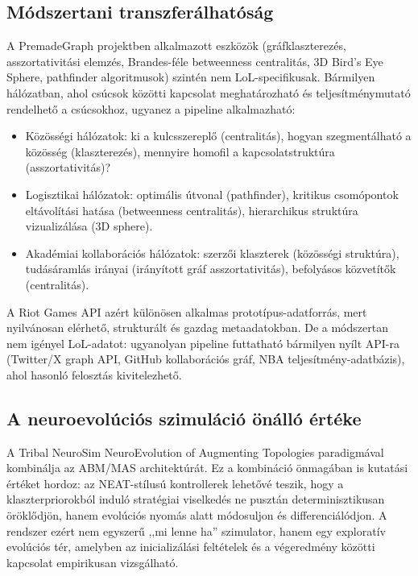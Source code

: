\subsection*{Módszertani transzferálhatóság}

A PremadeGraph projektben alkalmazott eszközök (gráfklaszterezés, asszortativitási
elemzés, Brandes-féle betweenness centralitás, 3D Bird's Eye Sphere, pathfinder
algoritmusok) szintén nem LoL-specifikusak. Bármilyen hálózatban, ahol csúcsok
közötti kapcsolat meghatározható és teljesítménymutató rendelhető a csúcsokhoz,
ugyanez a pipeline alkalmazható:

\begin{itemize}
  \item Közösségi hálózatok: ki a kulcsszereplő (centralitás), hogyan szegmentálható
    a közösség (klaszterezés), mennyire homofil a kapcsolatstruktúra (asszortativitás)?
  \item Logisztikai hálózatok: optimális útvonal (pathfinder), kritikus csomópontok
    eltávolítási hatása (betweenness centralitás), hierarchikus struktúra vizualizálása
    (3D sphere).
  \item Akadémiai kollaborációs hálózatok: szerzői klaszterek (közösségi struktúra),
    tudásáramlás irányai (irányított gráf asszortativitás), befolyásos közvetítők
    (centralitás).
\end{itemize}

A Riot Games API azért különösen alkalmas prototípus-adatforrás, mert nyilvánosan
elérhető, strukturált és gazdag metaadatokban. De a módszertan nem igényel LoL-adatot:
ugyanolyan pipeline futtatható bármilyen nyílt API-ra (Twitter/X graph API, GitHub
kollaborációs gráf, NBA teljesítmény-adatbázis), ahol hasonló felosztás kivitelezhető.

\subsection*{A neuroevolúciós szimuláció önálló értéke}

A Tribal NeuroSim NeuroEvolution of Augmenting Topologies paradigmával kombinálja az
ABM/MAS architektúrát. Ez a kombináció önmagában is kutatási értéket hordoz:
az NEAT-stílusú kontrollerek lehetővé teszik, hogy a klaszterpriorokból induló
stratégiai viselkedés ne pusztán determinisztikusan öröklődjön, hanem evolúciós
nyomás alatt módosuljon és differenciálódjon. A rendszer ezért nem egyszerű
,,mi lenne ha'' szimulator, hanem egy exploratív evolúciós tér, amelyben az
inicializálási feltételek és a végeredmény közötti kapcsolat empirikusan vizsgálható.

